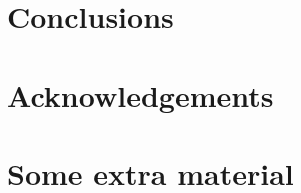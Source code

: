 \documentclass[fleqn,usenatbib]{mnras}
\begin{document}
\section{Conclusions}

\section*{Acknowledgements}









\appendix

\section{Some extra material}



\bsp	%
\label{lastpage}
\end{document}
